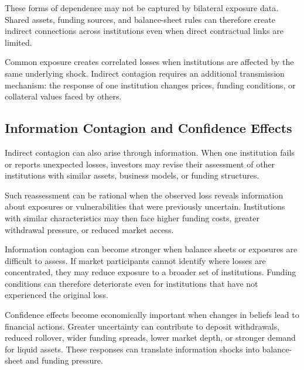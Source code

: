 These forms of dependence may not be captured by bilateral exposure data. Shared assets, funding sources, and balance-sheet rules can therefore create indirect connections across institutions even when direct contractual links are limited.
\begin{tcolorbox}[
  enhanced,
  breakable,
  colback=white,
  colframe=FinanceBlue,
  boxrule=0.7pt,
  sharp corners,
  borderline west={2.2pt}{0pt}{FinanceBlue},
  title=\textbf{Financial Perspective: Common Exposure Is Not Necessarily Contagion},
  coltitle=white,
  colbacktitle=FinanceBlue,
  fonttitle=\bfseries,
  before skip=1.2em,
  after skip=1.2em
]

Common exposure creates correlated losses when institutions are affected by the same underlying shock. Indirect contagion requires an additional transmission mechanism: the response of one institution changes prices, funding conditions, or collateral values faced by others.

\end{tcolorbox}

\subsection{Information Contagion and Confidence Effects}

Indirect contagion can also arise through information. When one institution fails or reports unexpected losses, investors may revise their assessment of other institutions with similar assets, business models, or funding structures.

Such reassessment can be rational when the observed loss reveals information about exposures or vulnerabilities that were previously uncertain. Institutions with similar characteristics may then face higher funding costs, greater withdrawal pressure, or reduced market access.

Information contagion can become stronger when balance sheets or exposures are difficult to assess. If market participants cannot identify where losses are concentrated, they may reduce exposure to a broader set of institutions. Funding conditions can therefore deteriorate even for institutions that have not experienced the original loss.

Confidence effects become economically important when changes in beliefs lead to financial actions. Greater uncertainty can contribute to deposit withdrawals, reduced rollover, wider funding spreads, lower market depth, or stronger demand for liquid assets. These responses can translate information shocks into balance-sheet and funding pressure.

